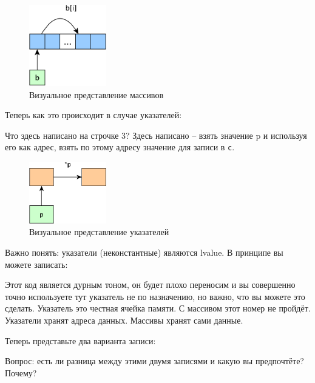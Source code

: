 \documentclass[a4paper,12pt,oneside]{article}
\begin{document}
\begin{figure}[h!]
\centering
\includegraphics[width=0.3\textwidth]{illustrations/arrays-crop.pdf}
\caption{Визуальное представление массивов}
\label{fig:arrays-crop}
\end{figure}

Теперь как это происходит в случае указателей:



Что здесь написано на строчке 3? Здесь написано – взять значение p и используя его как адрес, взять по этому адресу значение для записи в \lstinline!c!.

\begin{figure}[h!]
\centering
\includegraphics[width=0.3\textwidth]{illustrations/pointers-crop.pdf}
\caption{Визуальное представление указателей}
\label{fig:pointers-crop}
\end{figure}

Важно понять: указатели (неконстантные) являются lvalue. В принципе вы можете записать:



Этот код является дурным тоном, он будет плохо переносим и вы совершенно точно используете тут указатель не по назначению, но важно, что вы можете это сделать. Указатель это честная ячейка памяти. С массивом этот номер не пройдёт. Указатели хранят адреса данных. Массивы хранят сами данные.

Теперь представьте два варианта записи:



Вопрос: есть ли разница между этими двумя записями и какую вы предпочтёте? Почему?
\end{document}
